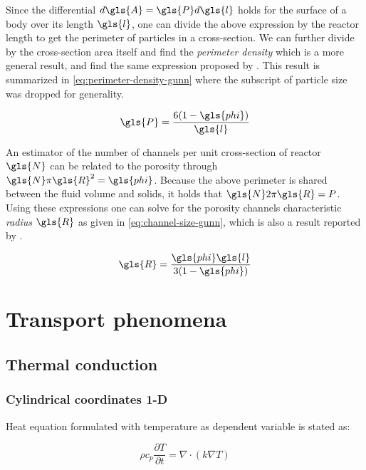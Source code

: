 \documentclass[oneside]{textbook}
\begin{document}
Since the differential $d\gls{A}=\gls{P}d\gls{l}$ holds for the surface of a body over its length $\gls{l}$, one can divide the above expression by the reactor length to get the perimeter of particles in a cross-section. We can further divide by the cross-section area itself and find the \emph{perimeter density} which is a more general result, and find the same expression proposed by \textcite{Gunn1978}. This result is summarized in \eqref{eq:perimeter-density-gunn} where the subscript of particle size was dropped for generality.

\begin{equation}
\gls{P} = \frac{6(1-\gls{phi})}{\gls{l}}
\label{eq:perimeter-density-gunn}
\end{equation}

An estimator of the number of channels per unit cross-section of reactor $\gls{N}$ can be related to the porosity through $\gls{N}\pi\gls{R}^2=\gls{phi}$. Because the above perimeter is shared between the fluid volume and solids, it holds that $\gls{N}2\pi\gls{R}=P$. Using these expressions one can solve for the porosity channels characteristic \emph{radius} $\gls{R}$ as given in \eqref{eq:channel-size-gunn}, which is also a result reported by \textcite{Gunn1978}.

\begin{equation}
\gls{R}=\frac{\gls{phi}\gls{l}}{3(1-\gls{phi})}
\label{eq:channel-size-gunn}
\end{equation}

\part{Transport phenomena}

\chapter{\label{ch:thermal-conduction}Thermal conduction}%

\section{Cylindrical coordinates 1-D}

Heat equation formulated with temperature as dependent variable is stated as:

\begin{equation}
\rho{}c_{p}\frac{\partial{}T}{\partial{}t}=\nabla\cdotp{}(k\nabla{}T)
\end{equation}
\end{document}
